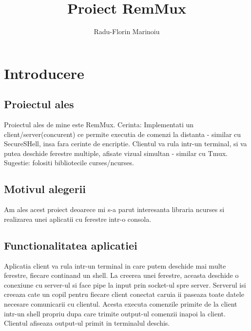 \documentclass[runningheads]{llncs}
\begin{document}
\title{Proiect RemMux}
\author{Radu-Florin Marinoiu}
\maketitle

\newpage
\section{Introducere}
\subsection{Proiectul ales}
Proiectul ales de mine este RemMux.\newline\newline
Cerinta: Implementati un client/server(concurent) ce permite executia de comenzi la distanta - similar cu SecureSHell, insa fara cerinte de encriptie.\newline
Clientul va rula intr-un terminal, si va putea deschide ferestre multiple, afisate vizual simultan - similar cu Tmux.\newline
Sugestie: folositi bibliotecile curses/ncurses. 

\subsection{Motivul alegerii}
Am ales acest proiect deoarece mi s-a parut interesanta libraria ncurses si realizarea unei aplicatii cu ferestre intr-o consola.

\subsection{Functionalitatea aplicatiei}
Aplicatia client va rula intr-un terminal in care putem deschide mai multe ferestre, fiecare continand un shell.\newline
La creerea unei ferestre, aceasta deschide o conexiune cu server-ul si face pipe la input prin socket-ul spre server.\newline
Serverul isi creeaza cate un copil pentru fiecare client conectat caruia ii paseaza toate datele necesare comunicarii cu clientul.
Acesta executa comenzile primite de la client intr-un shell propriu dupa care trimite output-ul comenzii inapoi la client.\newline
Clientul afiseaza output-ul primit in terminalul deschis.
\end{document}
